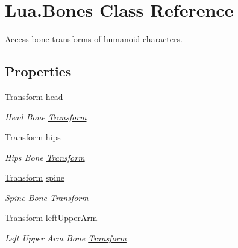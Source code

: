 \hypertarget{class_lua_1_1_bones}{}\section{Lua.\+Bones Class Reference}
\label{class_lua_1_1_bones}


Access bone transforms of humanoid characters.  


\subsection*{Properties}
\begin{DoxyCompactItemize}
\item 
\mbox{\hyperlink{class_lua_1_1_transform}{Transform}} \mbox{\hyperlink{class_lua_1_1_bones_a6ee9efaf692471552da3f885987361ca}{head}}
\begin{DoxyCompactList}\small\item\em Head Bone \mbox{\hyperlink{class_lua_1_1_transform}{Transform}} \end{DoxyCompactList}\item 
\mbox{\hyperlink{class_lua_1_1_transform}{Transform}} \mbox{\hyperlink{class_lua_1_1_bones_aaf90bd7cb3fbd050f890e985d7a8a160}{hips}}
\begin{DoxyCompactList}\small\item\em Hips Bone \mbox{\hyperlink{class_lua_1_1_transform}{Transform}} \end{DoxyCompactList}\item 
\mbox{\hyperlink{class_lua_1_1_transform}{Transform}} \mbox{\hyperlink{class_lua_1_1_bones_a28da7e69ef1c810bd255236404ad039a}{spine}}
\begin{DoxyCompactList}\small\item\em Spine Bone \mbox{\hyperlink{class_lua_1_1_transform}{Transform}} \end{DoxyCompactList}\item 
\mbox{\hyperlink{class_lua_1_1_transform}{Transform}} \mbox{\hyperlink{class_lua_1_1_bones_a3a134608353ae7791f13f2cce227ce7b}{left\+Upper\+Arm}}
\begin{DoxyCompactList}\small\item\em Left Upper Arm Bone \mbox{\hyperlink{class_lua_1_1_transform}{Transform}} \end{DoxyCompactList}\item 

\end{DoxyCompactItemize}
